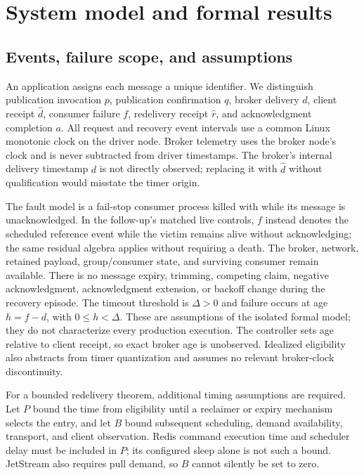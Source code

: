 \section{System model and formal results}\label{sec:model}

\subsection{Events, failure scope, and assumptions}

An application assigns each message a unique identifier. We distinguish publication invocation $p$, publication confirmation $q$, broker delivery $d$, client receipt $\widehat d$, consumer failure $f$, redelivery receipt $\widehat r$, and acknowledgment completion $a$. All request and recovery event intervals use a common Linux monotonic clock on the driver node. Broker telemetry uses the broker node's clock and is never subtracted from driver timestamps. The broker's internal delivery timestamp $d$ is not directly observed; replacing it with $\widehat d$ without qualification would misstate the timer origin.

The fault model is a fail-stop consumer process killed with  while its message is unacknowledged. In the follow-up's matched live controls, $f$ instead denotes the scheduled reference event while the victim remains alive without acknowledging; the same residual algebra applies without requiring a death. The broker, network, retained payload, group/consumer state, and surviving consumer remain available. There is no message expiry, trimming, competing claim, negative acknowledgment, acknowledgment extension, or backoff change during the recovery episode. The timeout threshold is $\Delta>0$ and failure occurs at age $h=f-d$, with $0\leq h<\Delta$. These are assumptions of the isolated formal model; they do not characterize every production execution. The controller sets age relative to client receipt, so exact broker age is unobserved. Idealized eligibility also abstracts from timer quantization and assumes no relevant broker-clock discontinuity.

For a bounded redelivery theorem, additional timing assumptions are required. Let $P$ bound the time from eligibility until a reclaimer or expiry mechanism selects the entry, and let $B$ bound subsequent scheduling, demand availability, transport, and client observation. Redis command execution time and scheduler delay must be included in $P$; its configured sleep alone is not such a bound. JetStream also requires pull demand, so $B$ cannot silently be set to zero.

